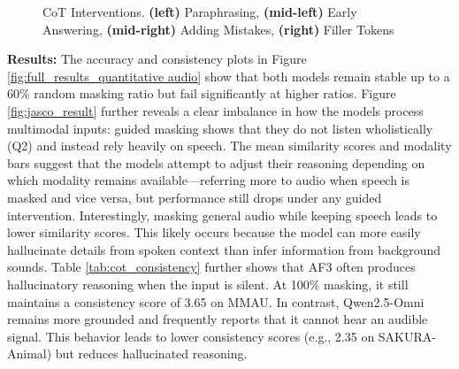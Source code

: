 \begin{figure}[t]
    \caption{CoT Interventions. \textbf{(left)} Paraphrasing, \textbf{(mid-left)} Early Answering, \textbf{(mid-right)} Adding Mistakes, \textbf{(right)} Filler Tokens} 
    \vspace{-.4cm}
    \label{fig:cot_intervention_grid}
\end{figure}


\noindent \textbf{Results:} 
The accuracy and consistency plots in Figure \ref{fig:full_results_quantitative audio} show that both models remain stable up to a 60\% random masking ratio but fail significantly at higher ratios. Figure \ref{fig:jasco_result} further reveals a clear imbalance in how the models process multimodal inputs: guided masking shows that they do not listen wholistically (Q2) and instead rely heavily on speech. The mean similarity scores and modality bars suggest that the models attempt to adjust their reasoning depending on which modality remains available—referring more to audio when speech is masked and vice versa, but performance still drops under any guided intervention. Interestingly, masking general audio while keeping speech leads to lower similarity scores. This likely occurs because the model can more easily hallucinate details from spoken context than infer information from background sounds. Table \ref{tab:cot_consistency} further shows that AF3 often produces hallucinatory reasoning when the input is silent. At 100\% masking, it still maintains a consistency score of 3.65 on MMAU. In contrast, Qwen2.5-Omni remains more grounded and frequently reports that it cannot hear an audible signal. This behavior leads to lower consistency scores (e.g., 2.35 on SAKURA-Animal) but reduces hallucinated reasoning.



